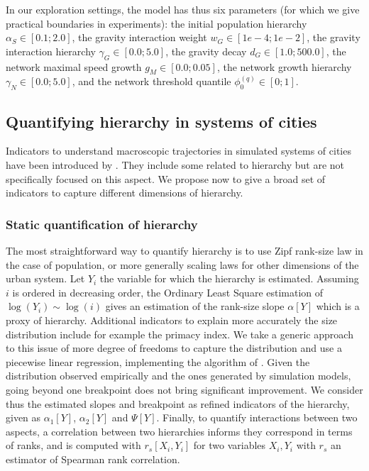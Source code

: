 \documentclass[11pt]{article}
\begin{document}
In our exploration settings, the model has thus six parameters (for which we give practical boundaries in experiments): the initial population hierarchy $\alpha_S \in \left[0.1; 2.0\right]$, the gravity interaction weight $w_G \in \left[1e-4; 1e-2 \right]$, the gravity interaction hierarchy $\gamma_G \in \left[0.0 ; 5.0 \right]$, the gravity decay $d_G \in \left[1.0; 500.0 \right]$, the network maximal speed growth $g_M \in \left[0.0; 0.05 \right]$, the network growth hierarchy $\gamma_N \in \left[0.0; 5.0\right]$, and the network threshold quantile $\phi_0^{(q)} \in \left[0;1\right]$.



\subsection{Quantifying hierarchy in systems of cities}


Indicators to understand macroscopic trajectories in simulated systems of cities have been introduced by \cite{raimbault2020unveiling}. They include some related to hierarchy but are not specifically focused on this aspect. We propose now to give a broad set of indicators to capture different dimensions of hierarchy.


\subsubsection{Static quantification of hierarchy}

The most straightforward way to quantify hierarchy is to use Zipf rank-size law in the case of population, or more generally scaling laws for other dimensions of the urban system. Let $Y_i$ the variable for which the hierarchy is estimated. Assuming $i$ is ordered in decreasing order, the Ordinary Least Square estimation of $\log \left(Y_i\right) \sim \log \left( i\right)$ gives an estimation of the rank-size slope $\alpha \left[Y\right]$ which is a proxy of hierarchy. Additional indicators to explain more accurately the size distribution include for example the primacy index. We take a generic approach to this issue of more degree of freedoms to capture the distribution and use a piecewise linear regression, implementing the algorithm of \cite{muggeo2003estimating}. Given the distribution observed empirically and the ones generated by simulation models, going beyond one breakpoint does not bring significant improvement. We consider thus the estimated slopes and breakpoint as refined indicators of the hierarchy, given as $\alpha_1 \left[Y\right]$,  $\alpha_2 \left[Y\right]$ and  $\Psi \left[Y\right]$. Finally, to quantify interactions between two aspects, a correlation between two hierarchies informs they correspond in terms of ranks, and is computed with $r_s\left[X_i,Y_i\right]$ for two variables $X_i,Y_i$ with $r_s$ an estimator of Spearman rank correlation.
\end{document}

